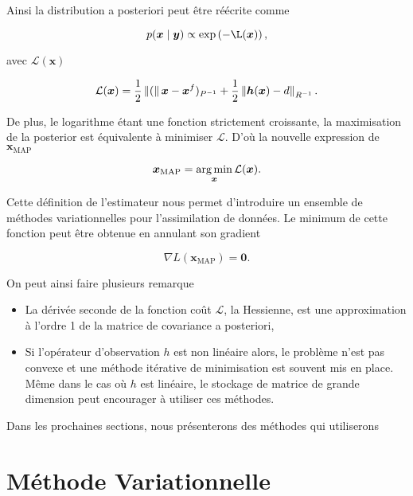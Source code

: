Ainsi la distribution a posteriori peut être réécrite comme

\begin{equation*}
    p(\bm x \mid \bm y) \propto \exp\left(- \mathcal{\L}(\bm x)\right),
\end{equation*}

avec $\mathcal L(\bm x)$

\begin{equation*}
    \mathcal L(\bm x) = \frac12 \left\lVert ( \right\rVert\bm x - \bm x^f)_{P^{-1}} + \frac12 \left\lVert \bm h(\bm x) - d \right\rVert_{R^{-1}}.
\end{equation*}

De plus, le logarithme étant une fonction strictement croissante, la maximisation de la posterior est équivalente à minimiser $\mathcal L$. D'où la nouvelle expression de $\bm x_{\text{MAP}}$

\begin{equation*}
    \bm x_{\text{MAP}} = \operatorname*{arg\,min}_{\bm x} \mathcal L(\bm x).
\end{equation*}

Cette définition de l'estimateur nous permet d'introduire un ensemble de méthodes variationnelles pour l'assimilation de données.
Le minimum de cette fonction peut être obtenue en annulant son gradient

\begin{equation*}
    \nabla  L(\bm x_{\text{MAP}}) = \bm 0.
\end{equation*}

On peut ainsi faire plusieurs remarque

\begin{itemize}
    \item La dérivée seconde de la fonction coût $\mathcal L$, la Hessienne, est une approximation à l'ordre 1 de la matrice de covariance a posteriori,
    \item Si l'opérateur d'observation $h$ est non linéaire alors, le problème n'est pas convexe et une méthode itérative de minimisation est souvent mis en place. Même dans le cas où $h$ est linéaire, le stockage de matrice de grande dimension peut encourager à utiliser ces méthodes.
\end{itemize}


Dans les prochaines sections, nous présenterons des méthodes qui utiliserons


\section{Méthode Variationnelle}


